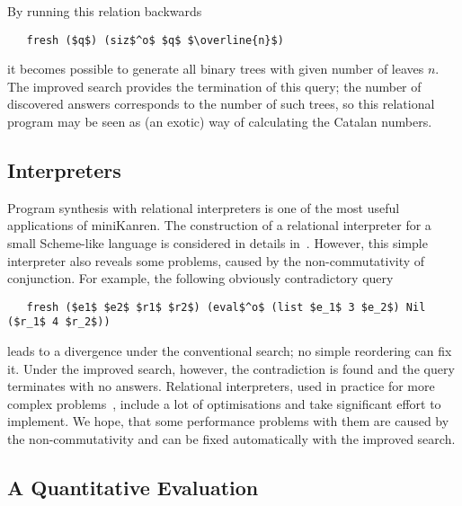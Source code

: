 By running this relation backwards

\begin{lstlisting}
   fresh ($q$) (siz$^o$ $q$ $\overline{n}$)
\end{lstlisting}

\noindent it becomes possible to generate all binary trees with given number of leaves $n$. 
The improved search provides the termination of this query; the number of discovered 
answers corresponds to the number of such trees, so this relational program may be seen 
as (an exotic) way of calculating the Catalan numbers.

\subsection{Interpreters}

Program synthesis with relational interpreters is one of the most useful applications of miniKanren. 
The construction of a relational interpreter for a small Scheme-like language is considered 
in details in~\cite{Untagged}. However, this simple interpreter also reveals some problems, caused by 
the non-commutativity of conjunction. For example, the following obviously contradictory query

\begin{lstlisting}
   fresh ($e1$ $e2$ $r1$ $r2$) (eval$^o$ (list $e_1$ 3 $e_2$) Nil ($r_1$ 4 $r_2$))
\end{lstlisting}

\noindent leads to a divergence under the conventional search; no simple reordering can fix it. 
Under the improved search, however, the contradiction is found and the query terminates with
no answers. Relational interpreters, used in practice for more complex problems~\cite{unified}, 
include a lot of optimisations and take significant effort to implement. We hope, that some 
performance problems with them are caused by the non-commutativity and can be fixed automatically 
with the improved search.

\subsection{A Quantitative Evaluation}


